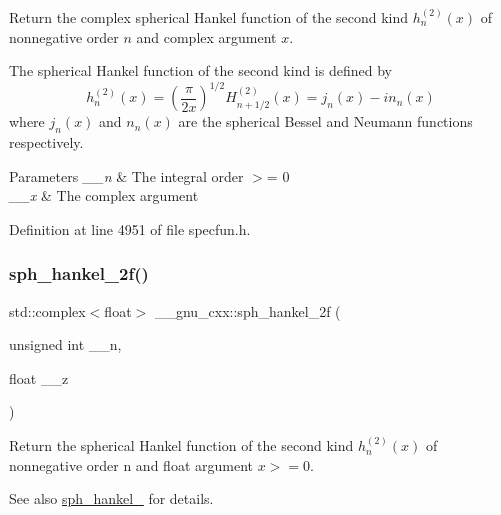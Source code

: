 Return the complex spherical Hankel function of the second kind $ h^{(2)}_n(x) $ of nonnegative order $ n $ and complex argument $ x $.

The spherical Hankel function of the second kind is defined by \[ h^{(2)}_n(x) = \left(\frac{\pi}{2x} \right) ^{1/2} H^{(2)}_{n+1/2}(x) = j_n(x) - i n_n(x) \] where $ j_n(x) $ and $ n_n(x) $ are the spherical Bessel and Neumann functions respectively.


\begin{DoxyParams}{Parameters}
{\em \+\_\+\+\_\+n} & The integral order $>$= 0 \\
\hline
{\em \+\_\+\+\_\+x} & The complex argument \\
\hline
\end{DoxyParams}


Definition at line 4951 of file specfun.\+h.

\mbox{\label{group__gnu__math__spec__func_ga9496b81f94b8ba0162cf45df72be1e71}} 
\subsubsection{\texorpdfstring{sph\+\_\+hankel\+\_\+2f()}{sph\_hankel\_2f()}\hspace{0.1cm}{\footnotesize\ttfamily [1/2]}}
{\footnotesize\ttfamily std\+::complex$<$float$>$ \+\_\+\+\_\+gnu\+\_\+cxx\+::sph\+\_\+hankel\+\_\+2f (\begin{DoxyParamCaption}\item[{unsigned int}]{\+\_\+\+\_\+n,  }\item[{float}]{\+\_\+\+\_\+z }\end{DoxyParamCaption})\hspace{0.3cm}{\ttfamily [inline]}}

Return the spherical Hankel function of the second kind $ h^{(2)}_n(x)$ of nonnegative order n and {\ttfamily float} argument $ x >= 0 $.

\begin{DoxySeeAlso}{See also}
\hyperlink{group__gnu__math__spec__func_ga1ca08866a25e3637b04c57ff5a0c36a5}{sph\+\_\+hankel\+\_} for details. 
\end{DoxySeeAlso}


